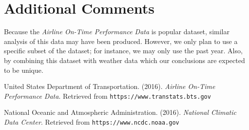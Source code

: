 \documentclass[a4paper, 12pt]{article}
\begin{document}
\section*{Additional Comments}

Because the \textit{Airline On-Time Performance Data} is popular dataset, similar analysis of this data may have been produced. However, we only plan to use a specific subset of the dataset; for instance, we may only use the past year. Also, by combining this dataset with weather data which our conclusions are expected to be unique.

\begin{thebibliography}{9}

United States Department of Transportation. (2016). 
\textit{Airline On-Time Performance Data}. 
Retrieved from \texttt{https://www.transtats.bts.gov}

National Oceanic and Atmospheric Administration. (2016). 
\textit{National Climatic Data Center}. 
Retrieved from \texttt{https://www.ncdc.noaa.gov}

\end{thebibliography}
\end{document}
